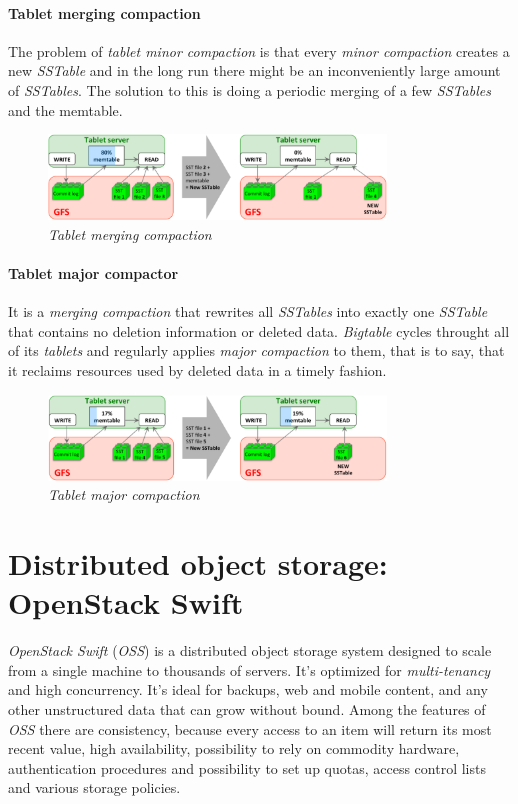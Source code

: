 \paragraph{Tablet merging compaction}
The problem of \emph{tablet minor compaction} is that every \emph{minor
compaction} creates a new \emph{SSTable} and in the long run there might be
an inconveniently large amount of \emph{SSTables}. The solution to this is
doing a periodic merging of a few \emph{SSTables} and the memtable.

\begin{figure}[ht!]
    \centering
    \includegraphics[width=0.8\textwidth]{images/gbt-tablet-merge-comp.png}
    \caption{\emph{Tablet merging compaction}}
\end{figure}

\paragraph{Tablet major compactor}
It is a \emph{merging compaction} that rewrites all \emph{SSTables} into
exactly one \emph{SSTable} that contains no deletion information or deleted
data. \emph{Bigtable} cycles throught all of its \emph{tablets} and regularly
applies \emph{major compaction} to them, that is to say, that it reclaims
resources used by deleted data in a timely fashion.

\begin{figure}[h!]
    \centering
    \includegraphics[width=0.8\textwidth]{images/gbt-tablet-major-comp.png}
    \caption{\emph{Tablet major compaction}}
\end{figure}

\section{Distributed object storage: OpenStack Swift}
\emph{OpenStack Swift} (\emph{OSS}) is a distributed object storage system
designed to scale from a single machine to thousands of servers. It's optimized
for \emph{multi-tenancy} and high concurrency. It's ideal for backups, web and
mobile content, and any other unstructured data that can grow without bound.
Among the features of \emph{OSS} there are consistency, because every access to
an item will return its most recent value, high availability, possibility to
rely on commodity hardware, authentication procedures and possibility to set
up quotas, access control lists and various storage policies.


